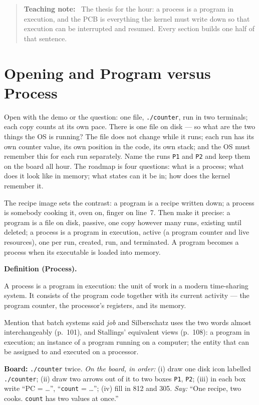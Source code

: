 \documentclass[11pt]{article}
\newenvironment{definitionbox}[1]{%
  \par\noindent\textbf{Definition (#1).}\ \itshape
}{\par\vspace{0.3em}}
\newenvironment{teachingaside}{\begin{quote}\small\color{primary-gold}\textbf{Teaching note:}\ }{\end{quote}}
\begin{document}
\begin{teachingaside}
The thesis for the hour: a process is a program in execution, and the PCB is everything the kernel must write down so that execution can be interrupted and resumed. Every section builds one half of that sentence.
\end{teachingaside}

\section{Opening and Program versus Process}

Open with the demo or the question: one file, \texttt{./counter}, run in two terminals; each copy counts at its own pace. There is one file on disk --- so what are the two things the OS is running? The file does not change while it runs; each run has its own counter value, its own position in the code, its own stack; and the OS must remember this for each run separately. Name the runs \texttt{P1} and \texttt{P2} and keep them on the board all hour. The roadmap is four questions: what is a process; what does it look like in memory; what states can it be in; how does the kernel remember it.

The recipe image sets the contrast: a program is a recipe written down; a process is somebody cooking it, oven on, finger on line~7. Then make it precise: a program is a file on disk, passive, one copy however many runs, existing until deleted; a process is a program in execution, active (a program counter and live resources), one per run, created, run, and terminated. A program becomes a process when its executable is loaded into memory.

\begin{definitionbox}{Process}
A process is a program in execution: the unit of work in a modern time-sharing system. It consists of the program code together with its current activity --- the program counter, the processor's registers, and its memory.
\end{definitionbox}

Mention that batch systems said \emph{job} and Silberschatz uses the two words almost interchangeably (p.~101), and Stallings' equivalent views (p.~108): a program in execution; an instance of a program running on a computer; the entity that can be assigned to and executed on a processor.

\textbf{Board:} \texttt{./counter} twice. \emph{On the board, in order:} (i) draw one disk icon labelled \texttt{./counter}; (ii) draw two arrows out of it to two boxes \texttt{P1}, \texttt{P2}; (iii) in each box write ``PC = \ldots'', ``\texttt{count} = \ldots''; (iv) fill in 812 and 305. \emph{Say:} ``One recipe, two cooks. \texttt{count} has two values at once.''
\end{document}
